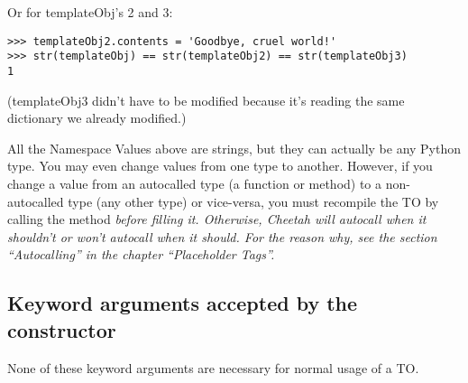 Or for templateObj's 2 and 3:

\begin{verbatim}
>>> templateObj2.contents = 'Goodbye, cruel world!'
>>> str(templateObj) == str(templateObj2) == str(templateObj3)
1
\end{verbatim}

(templateObj3 didn't have to be modified because it's reading the same
 dictionary we already modified.)

All the Namespace Values above are strings, but they can actually be any Python
type.  You may even change values from one type to another.  However, if you
change a value from an autocalled type (a function or method) to a
non-autocalled type (any other type) or vice-versa, you must recompile the
TO by calling the  method \em{before filling it}.
Otherwise, Cheetah will autocall when it shouldn't or
won't autocall when it should.  For the reason why, see the section
``Autocalling'' in the chapter ``Placeholder Tags''.



\subsection{Keyword arguments accepted by the constructor}

None of these keyword arguments are necessary for normal usage of a TO.

